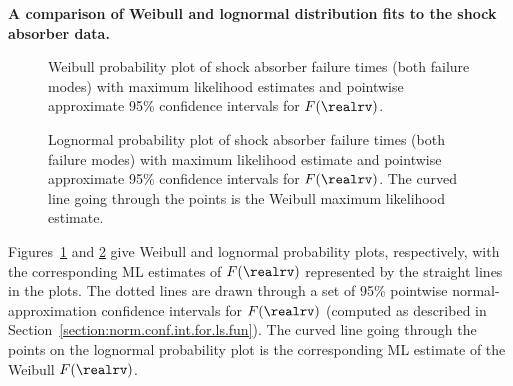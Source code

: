 \begin{example}
{\bf A comparison of Weibull and lognormal 
distribution fits to the shock absorber data.}
\begin{figure}
\caption{Weibull probability plot
of shock absorber failure times (both failure modes) with maximum
likelihood estimates and pointwise approximate 95\% confidence
intervals for $F(\realrv)$.}
\label{figure:shockabsB.mlep.weib.ps}
\end{figure}
\begin{figure}
\caption{Lognormal probability plot
of shock absorber failure times (both failure modes) with maximum
likelihood estimate and pointwise approximate 95\% confidence
intervals for $F(\realrv)$. The curved line going through the points
is the Weibull maximum likelihood estimate.}
\label{figure:shockabsB.mlep.lnor.ps}
\end{figure}
Figures~\ref{figure:shockabsB.mlep.weib.ps} and
\ref{figure:shockabsB.mlep.lnor.ps} give Weibull and lognormal
probability plots, respectively, with the corresponding ML estimates
of $F(\realrv)$ represented by the straight lines in the plots.  The
dotted lines are drawn through a set of 95\% pointwise normal-approximation
confidence intervals for $F(\realrv)$ (computed as described in
Section~\ref{section:norm.conf.int.for.ls.fun}). The
curved line going through the points on the lognormal probability plot
is the corresponding ML estimate of the Weibull $F(\realrv)$. 


\end{example}
